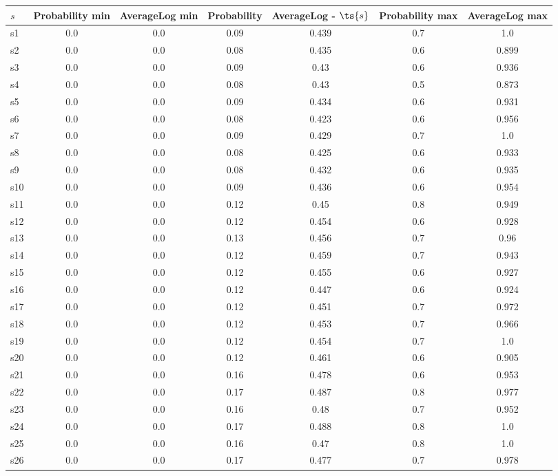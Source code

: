 \documentclass{article}
\begin{document}
\noindent\begin{tabular}{|l|c|c|c|c|c|c|}
\hline
$s$& Probability min & AverageLog min & Probability & AverageLog - $\ts{s}$ & Probability max & AverageLog max\\
\hline
s1 &0.0 & 0.0 & 0.09 & 0.439 & 0.7 & 1.0\\
\hline
s2 &0.0 & 0.0 & 0.08 & 0.435 & 0.6 & 0.899\\
\hline
s3 &0.0 & 0.0 & 0.09 & 0.43 & 0.6 & 0.936\\
\hline
s4 &0.0 & 0.0 & 0.08 & 0.43 & 0.5 & 0.873\\
\hline
s5 &0.0 & 0.0 & 0.09 & 0.434 & 0.6 & 0.931\\
\hline
s6 &0.0 & 0.0 & 0.08 & 0.423 & 0.6 & 0.956\\
\hline
s7 &0.0 & 0.0 & 0.09 & 0.429 & 0.7 & 1.0\\
\hline
s8 &0.0 & 0.0 & 0.08 & 0.425 & 0.6 & 0.933\\
\hline
s9 &0.0 & 0.0 & 0.08 & 0.432 & 0.6 & 0.935\\
\hline
s10 &0.0 & 0.0 & 0.09 & 0.436 & 0.6 & 0.954\\
\hline
s11 &0.0 & 0.0 & 0.12 & 0.45 & 0.8 & 0.949\\
\hline
s12 &0.0 & 0.0 & 0.12 & 0.454 & 0.6 & 0.928\\
\hline
s13 &0.0 & 0.0 & 0.13 & 0.456 & 0.7 & 0.96\\
\hline
s14 &0.0 & 0.0 & 0.12 & 0.459 & 0.7 & 0.943\\
\hline
s15 &0.0 & 0.0 & 0.12 & 0.455 & 0.6 & 0.927\\
\hline
s16 &0.0 & 0.0 & 0.12 & 0.447 & 0.6 & 0.924\\
\hline
s17 &0.0 & 0.0 & 0.12 & 0.451 & 0.7 & 0.972\\
\hline
s18 &0.0 & 0.0 & 0.12 & 0.453 & 0.7 & 0.966\\
\hline
s19 &0.0 & 0.0 & 0.12 & 0.454 & 0.7 & 1.0\\
\hline
s20 &0.0 & 0.0 & 0.12 & 0.461 & 0.6 & 0.905\\
\hline
s21 &0.0 & 0.0 & 0.16 & 0.478 & 0.6 & 0.953\\
\hline
s22 &0.0 & 0.0 & 0.17 & 0.487 & 0.8 & 0.977\\
\hline
s23 &0.0 & 0.0 & 0.16 & 0.48 & 0.7 & 0.952\\
\hline
s24 &0.0 & 0.0 & 0.17 & 0.488 & 0.8 & 1.0\\
\hline
s25 &0.0 & 0.0 & 0.16 & 0.47 & 0.8 & 1.0\\
\hline
s26 &0.0 & 0.0 & 0.17 & 0.477 & 0.7 & 0.978\\

\end{tabular}
\end{document}
